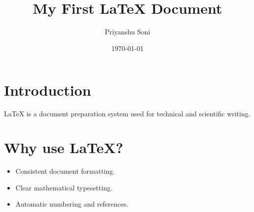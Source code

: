 \documentclass[12pt,a4paper]{article}
\title{My First \LaTeX{} Document}
\author{Priyanshu Soni}
\date{\today}
\begin{document}
\maketitle

\section{Introduction}
LaTeX is a document preparation system used for technical and scientific writing.

\section{Why use LaTeX?}
\begin{itemize}
    \item Consistent document formatting.
    \item Clear mathematical typesetting.
    \item Automatic numbering and references.
\end{itemize}
\end{document}
